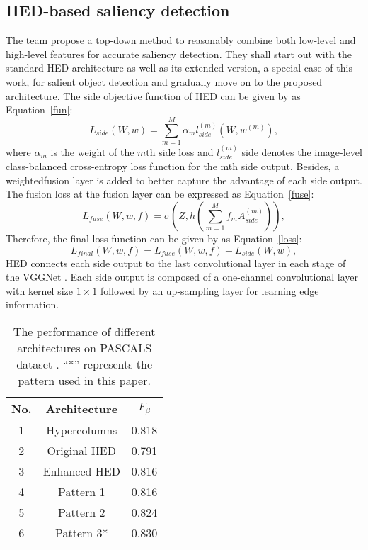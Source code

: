 \documentclass[10pt,twocolumn,letterpaper]{article}
\begin{document}
\subsection{HED-based saliency detection}
The team propose a top-down method to reasonably combine both low-level and high-level features for accurate saliency detection. They shall start out with the standard HED architecture as well as its extended version, a special case of this work, for salient object detection and gradually move on to the proposed architecture. The side objective function of HED can be given by as Equation~\ref{fun}:
\begin{equation}
L_{side}(W,w)=\sum_{m=1}^{M}\alpha_ml_{side}^{(m)}(W,w^{(m)}),  \label{fun} 
\end{equation}
where $\alpha_m$ is the weight of the $m$th side loss and $l_{side}^{(m)}$ side denotes the image-level class-balanced cross-entropy loss function for the mth side output. Besides, a weightedfusion layer is added to better capture the advantage of each side output. The fusion loss at the fusion layer can be expressed as Equation~\ref{fuse}:
\begin{equation}
L_{fuse}(W,w,f)=\sigma(Z,h(\sum_{m=1}^{M}f_mA_{side}^{(m)})), \label{fuse} 
\end{equation}
Therefore, the final loss function can be given by as Equation~\ref{loss}:
\begin{equation}
L_{final}(W,w,f)=L_{fuse}(W,w,f)+L_{side}(W,w), \label{loss} 
\end{equation}
HED connects each side output to the last convolutional layer in each stage of the VGGNet \cite{simonyan2014very}. Each side output is composed of a one-channel convolutional layer with kernel size $1\times 1$ followed by an up-sampling layer for learning edge information.

\begin{table}[tp]
	\begin{center}
	\caption{The performance of different architectures on PASCALS dataset \cite{Li2014The}. ``*'' represents the pattern used in this paper.} \label{Com}
	\begin{tabular}{c|c|c}
		\hline
		No. & Architecture & $F_\beta$ \\
		\hline
		1 & Hypercolumns \cite{Hariharan2014Hypercolumns} & 0.818 \\
		2 & Original HED \cite{Saining2015Holistically} & 0.791 \\
		3  & Enhanced HED & 0.816 \\
		4 & Pattern 1 & 0.816 \\
		5 & Pattern 2 & 0.824 \\
		6 & Pattern 3* & 0.830 \\
		\hline
	\end{tabular}
\end{center}
\end{table}
\end{document}
